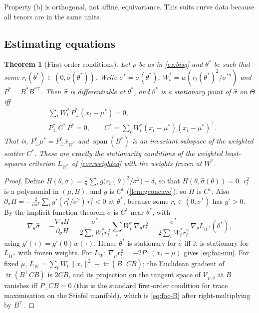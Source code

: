 \documentclass[11pt]{article}
\newtheorem{theorem}{Theorem}[section]
\theoremstyle{definition}
\theoremstyle{remark}
\DeclareMathOperator{\tr}{tr}
\DeclareMathOperator{\spn}{span}
\newcommand{\V}{\mathcal{V}}
\newcommand{\norm}[1]{\lVert #1\rVert}
\newcommand{\tx}{\tilde{x}}
\newcommand{\Pp}{P_{\!\perp}}
\begin{document}
Property (b) is orthogonal, not affine, equivariance. This suits curve data because all tenors are in the same units.

\subsection{Estimating equations}

\begin{theorem}[First-order conditions]\label{thm:foc}
Let $\rho$ be as in \cref{ex:bisq} and $\theta^*$ be such that some $r_t(\theta^*)\in(0,\hat\sigma(\theta^*))$.
Write $\sigma^*=\hat\sigma(\theta^*)$, $W_t^*=w(r_t(\theta^*)^2/\sigma^{*2})$ and $P^*=B^*B^{*\top}$.
Then $\hat\sigma$ is differentiable at $\theta^*$, and $\theta^*$ is a stationary point of $\hat\sigma$ on $\Theta$ iff
\begin{align}
&\textstyle\sum_tW_t^*\,\Pp^*(x_t-\mu^*)=0, \label{eq:foc-mu}\\
&\Pp^*\,C^*\,P^*=0,\qquad C^*=\textstyle\sum_tW_t^*(x_t-\mu^*)(x_t-\mu^*)^\top. \label{eq:foc-B}
\end{align}
That is, $\Pp^*\mu^*=\Pp^*\bar x_{W^*}$ and $\spn(B^*)$ is an invariant subspace of the weighted scatter $C^*$.
These are exactly the stationarity conditions of the weighted least-squares criterion $L_{W^*}$ of
\cref{cor:weighted} with the weights frozen at $W^*$.
\end{theorem}
\begin{proof}
Define $H(\theta,\sigma)=\frac1n\sum_tg\bigl(r_t(\theta)^2/\sigma^2\bigr)-\delta$, so that $H(\theta,\hat\sigma(\theta))=0$.
$r_t^2$ is a polynomial in $(\mu,B)$, and $g$ is $C^1$ (\cref{lem:gconcave}), so $H$ is $C^1$. Also
$\partial_\sigma H=-\frac{2}{n\sigma^3}\sum_tg'(r_t^2/\sigma^2)\,r_t^2<0$ at $\theta^*$, because some
$r_t\in(0,\sigma^*)$ has $g'>0$. By the implicit function theorem $\hat\sigma$ is $C^1$ near $\theta^*$, with
\[
\nabla_\theta\hat\sigma=-\frac{\nabla_\theta H}{\partial_\sigma H}
=\frac{\sigma^{*}}{2\sum_tW_t^*r_t^2}\sum_tW_t^*\,\nabla_\theta r_t^2
=\frac{\sigma^{*}}{2\sum_tW_t^*r_t^2}\,\nabla_\theta L_{W^*}(\theta^*),
\]
using $g'(\tau)=g'(0)w(\tau)$. Hence $\theta^*$ is stationary for $\hat\sigma$ iff it is stationary for $L_{W^*}$ with frozen weights.
For $L_{W}$: $\nabla_\mu r_t^2=-2\Pp(x_t-\mu)$ gives \eqref{eq:foc-mu}. For fixed $\mu$,
$L_W=\sum_tW_t\norm{\tx_t}^2-\tr(B^\top CB)$; the Euclidean gradient of $\tr(B^\top CB)$ is $2CB$, and its
projection on the tangent space of $\V_{p,q}$ at $B$ vanishes iff $\Pp CB=0$ (this is the standard
first-order condition for trace maximisation on the Stiefel manifold), which is \eqref{eq:foc-B} after right-multiplying by $B^\top$.
\end{proof}
\end{document}
